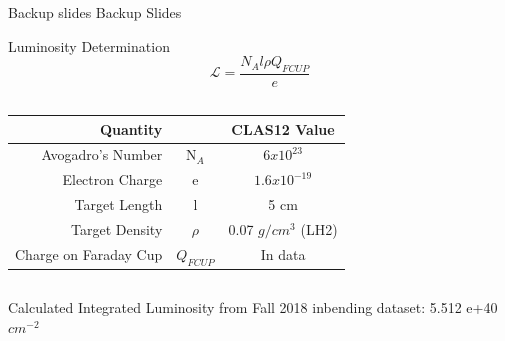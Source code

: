 \documentclass[aspectratio=169]{beamer}
\newcommand{\Lumi}{ \mathcal{L}}
\begin{document}
\appendix



\begin{frame}{Backup slides}
Backup Slides

\end{frame}


\begin{frame}{ Luminosity Determination}
         \begin{equation*}
                    \Lumi = \frac{N_A l \rho Q_{FCUP}}{e}
        \end{equation*}
        
        \begin{columns}
                                
                \begin{table}
                    \centering
                    \begin{tabular}{rcc}
                        Quantity &  & CLAS12 Value \\\hline
                       Avogadro's Number &  N$_A$  & $6x10^{23}$ \\
                        Electron Charge &e  &  $1.6x10^{-19}$ \\
                        Target Length &l &  5 cm \\
                        Target Density &$\rho$  &  0.07 $g/cm^3$ (LH2) \\
                        Charge on Faraday Cup & $Q_{FCUP}$ &  In data\\
                    \end{tabular}
                    \label{tab:demo}
                \end{table}
        \end{columns}
       Calculated Integrated Luminosity from Fall 2018 inbending dataset: 5.512 e+40 $cm^{-2}$
\end{frame}    
\end{document}

